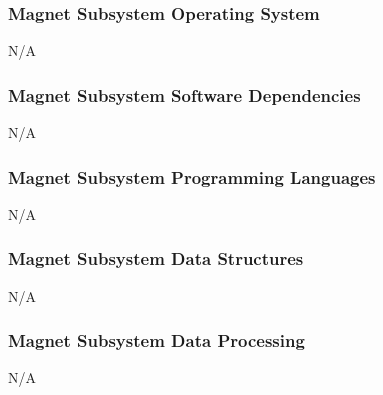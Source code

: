 \subsubsection{Magnet Subsystem Operating System}
N/A

\subsubsection{Magnet Subsystem Software Dependencies}
N/A

\subsubsection{Magnet Subsystem Programming Languages}
N/A

\subsubsection{Magnet Subsystem Data Structures}
N/A

\subsubsection{Magnet Subsystem Data Processing}
N/A
